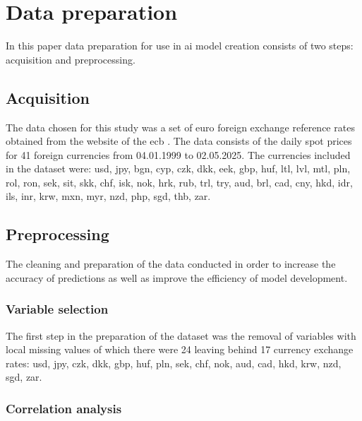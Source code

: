 \section{Data preparation}\label{Data preparation}

In this paper data preparation for use in \gls{ai} model creation consists of two steps: acquisition and preprocessing.

\subsection{Acquisition}\label{Acquisition}

The data chosen for this study was a set of euro foreign exchange reference rates obtained from the website of the \gls{ecb} \cite{forex-data}. The data consists of the daily spot prices for 41 foreign currencies from 04.01.1999 to 02.05.2025. The currencies included in the dataset were: \gls{usd}, \gls{jpy}, \gls{bgn}, \gls{cyp}, \gls{czk}, \gls{dkk}, \gls{eek}, \gls{gbp}, \gls{huf}, \gls{ltl}, \gls{lvl}, \gls{mtl}, \gls{pln}, \gls{rol}, \gls{ron}, \gls{sek}, \gls{sit}, \gls{skk}, \gls{chf}, \gls{isk}, \gls{nok}, \gls{hrk}, \gls{rub}, \gls{trl}, \gls{try}, \gls{aud}, \gls{brl}, \gls{cad}, \gls{cny}, \gls{hkd}, \gls{idr}, \gls{ils}, \gls{inr}, \gls{krw}, \gls{mxn}, \gls{myr}, \gls{nzd}, \gls{php}, \gls{sgd}, \gls{thb}, \gls{zar}.

\subsection{Preprocessing}\label{Preprocessing}

The cleaning and preparation of the data conducted in order to increase the accuracy of predictions as well as improve the efficiency of model development.

\subsubsection{Variable selection}\label{Variable selection}

The first step in the preparation of the dataset was the removal of variables with local missing values of which there were 24 leaving behind 17 currency exchange rates: \gls{usd}, \gls{jpy}, \gls{czk}, \gls{dkk}, \gls{gbp}, \gls{huf}, \gls{pln}, \gls{sek}, \gls{chf}, \gls{nok}, \gls{aud}, \gls{cad}, \gls{hkd}, \gls{krw}, \gls{nzd}, \gls{sgd}, \gls{zar}.

\subsubsection{Correlation analysis}\label{Correlation analysis}

